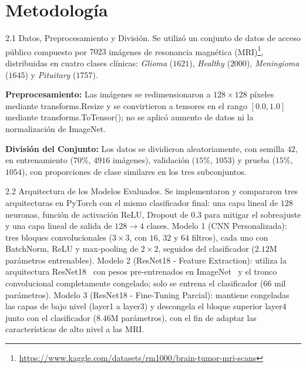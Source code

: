 \documentclass[letterpaper, 10 pt, conference]{ieeeconf}  %
\begin{document}
\section{Metodología}

2.1 Datos, Preprocesamiento y División.
Se utilizó un conjunto de datos de acceso público compuesto por $7023$ imágenes de resonancia magnética (MRI)\footnote{\url{https://www.kaggle.com/datasets/rm1000/brain-tumor-mri-scans}}, distribuidas en cuatro clases clínicas: \textit{Glioma} ($1621$), \textit{Healthy} ($2000$), \textit{Meningioma} ($1645$) y \textit{Pituitary} ($1757$).

\textbf{Preprocesamiento:} Las imágenes se redimensionaron a $128\times128$ píxeles mediante transforms.Resize y se convirtieron a tensores en el rango $[0.0, 1.0]$ mediante transforms.ToTensor(); no se aplicó aumento de datos ni la normalización de ImageNet.

\textbf{División del Conjunto:} Los datos se dividieron aleatoriamente, con semilla $42$, en entrenamiento ($70\%$, $4916$ imágenes), validación ($15\%$, $1053$) y prueba ($15\%$, $1054$), con proporciones de clase similares en los tres subconjuntos.

2.2 Arquitectura de los Modelos Evaluados.
Se implementaron y compararon tres arquitecturas en PyTorch con el mismo clasificador final: una capa lineal de $128$ neuronas, función de activación ReLU, Dropout de $0.3$ para mitigar el sobreajuste y una capa lineal de salida de $128 \to 4$ clases.
Modelo 1 (CNN Personalizada): tres bloques convolucionales ($3\times3$, con $16$, $32$ y $64$ filtros), cada uno con BatchNorm, ReLU y max-pooling de $2\times2$, seguidos del clasificador ($2.12$M parámetros entrenables).
Modelo 2 (ResNet18 - Feature Extraction): utiliza la arquitectura ResNet18~\cite{he2016} con pesos pre-entrenados en ImageNet~\cite{deng2009} y el tronco convolucional completamente congelado; solo se entrena el clasificador ($66$ mil parámetros).
Modelo 3 (ResNet18 - Fine-Tuning Parcial): mantiene congeladas las capas de bajo nivel (layer1 a layer3) y descongela el bloque superior layer4 junto con el clasificador ($8.46$M parámetros), con el fin de adaptar las características de alto nivel a las MRI.
\end{document}
